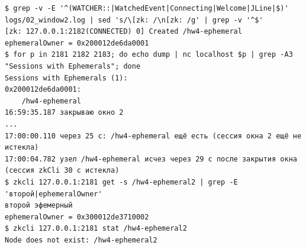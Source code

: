 \begin{Verbatim}
$ grep -v -E '^(WATCHER::|WatchedEvent|Connecting|Welcome|JLine|$)' logs/02_window2.log | sed 's/\[zk: /\n[zk: /g' | grep -v '^$'
[zk: 127.0.0.1:2182(CONNECTED) 0] Created /hw4-ephemeral
ephemeralOwner = 0x200012de6da0001
$ for p in 2181 2182 2183; do echo dump | nc localhost $p | grep -A3 "Sessions with Ephemerals"; done
Sessions with Ephemerals (1):
0x200012de6da0001:
    /hw4-ephemeral
16:59:35.187 закрываю окно 2
...
17:00:00.110 через 25 с: /hw4-ephemeral ещё есть (сессия окна 2 ещё не истекла)
17:00:04.782 узел /hw4-ephemeral исчез через 29 с после закрытия окна (сессия zkCli 30 с истекла)
$ zkcli 127.0.0.1:2181 get -s /hw4-ephemeral2 | grep -E 'второй|ephemeralOwner'
второй эфемерный
ephemeralOwner = 0x300012de3710002
$ zkcli 127.0.0.1:2181 stat /hw4-ephemeral2
Node does not exist: /hw4-ephemeral2
\end{Verbatim}
